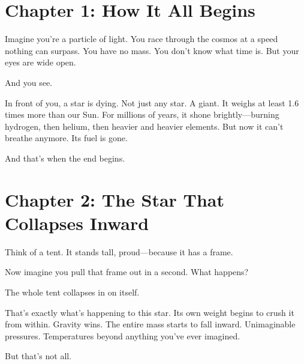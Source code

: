 \documentclass{article}
\begin{document}

\section*{Chapter 1: How It All Begins}

\noindent
Imagine you're a particle of light.  
You race through the cosmos at a speed nothing can surpass.  
You have no mass.  
You don't know what time is.  
But your eyes are wide open.

\vspace{1ex}
\noindent
And you see.

\vspace{1ex}
\noindent
In front of you, a star is dying.  
Not just any star. A giant.  
It weighs at least 1.6 times more than our Sun.  
For millions of years, it shone brightly—burning hydrogen, then helium, then heavier and heavier elements.  
But now it can’t breathe anymore. Its fuel is gone.

\vspace{1ex}
\noindent
And that’s when the end begins.


\section*{Chapter 2: The Star That Collapses Inward}

\noindent
Think of a tent.  
It stands tall, proud—because it has a frame.

\vspace{1ex}
\noindent
Now imagine you pull that frame out in a second.  
What happens?

\vspace{1ex}
\noindent
The whole tent collapses in on itself.

\vspace{1ex}
\noindent
That’s exactly what’s happening to this star.  
Its own weight begins to crush it from within.  
Gravity wins.  
The entire mass starts to fall inward.  
Unimaginable pressures. Temperatures beyond anything you’ve ever imagined.

\vspace{1ex}
\noindent
But that’s not all.
\end{document}
